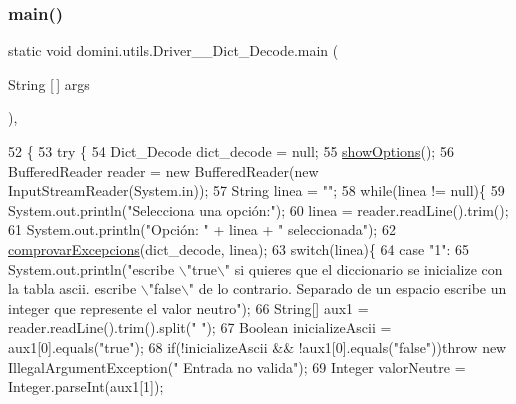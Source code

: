 \subsubsection{\texorpdfstring{main()}{main()}}
{\footnotesize\ttfamily static void domini.\+utils.\+Driver\+\_\+\+\_\+\+Dict\+\_\+\+Decode.\+main (\begin{DoxyParamCaption}\item[{String \mbox{[}$\,$\mbox{]}}]{args }\end{DoxyParamCaption})\hspace{0.3cm}{\ttfamily [inline]}, {\ttfamily [static]}}


\begin{DoxyCode}
52                                            \{
53     \textcolor{keywordflow}{try} \{
54         Dict\_Decode dict\_decode = null;
55         \hyperlink{classdomini_1_1utils_1_1Driver____Dict__Decode_af3ae63bfc55ea99e468d6c9c86ec26c9}{showOptions}();
56         BufferedReader reader = \textcolor{keyword}{new} BufferedReader(\textcolor{keyword}{new} InputStreamReader(System.in));
57         String linea = \textcolor{stringliteral}{""};
58         \textcolor{keywordflow}{while}(linea != null)\{
59             System.out.println(\textcolor{stringliteral}{"Selecciona una opción:"});
60             linea = reader.readLine().trim();
61             System.out.println(\textcolor{stringliteral}{"Opción: "} + linea + \textcolor{stringliteral}{" seleccionada"});
62             \hyperlink{classdomini_1_1utils_1_1Driver____Dict__Decode_a41ddfd0f1473de9401aa7860cff2f3e8}{comprovarExcepcions}(dict\_decode, linea);
63             \textcolor{keywordflow}{switch}(linea)\{
64                 \textcolor{keywordflow}{case} \textcolor{stringliteral}{"1"}:
65                     System.out.println(\textcolor{stringliteral}{"escribe \(\backslash\)"true\(\backslash\)" si quieres que el diccionario se inicialize con la
       tabla ascii. escribe \(\backslash\)"false\(\backslash\)" de lo contrario. Separado de un espacio escribe un integer que represente el
       valor neutro"});
66                     String[] aux1 = reader.readLine().trim().split(\textcolor{stringliteral}{" "});
67                     Boolean inicializeAscii = aux1[0].equals(\textcolor{stringliteral}{"true"});
68                     \textcolor{keywordflow}{if}(!inicializeAscii && !aux1[0].equals(\textcolor{stringliteral}{"false"}))\textcolor{keywordflow}{throw} \textcolor{keyword}{new} IllegalArgumentException(\textcolor{stringliteral}{"
      Entrada no valida"});
69                     Integer valorNeutre = Integer.parseInt(aux1[1]);

\end{DoxyCode}

